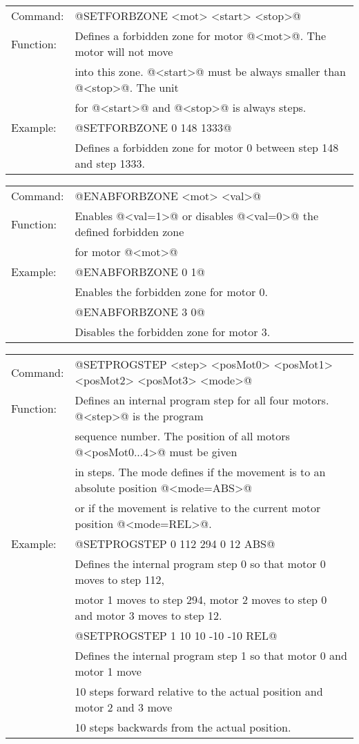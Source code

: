 \vspace{\vdistace}

\begin{tabular}{ll}
Command: & @SETFORBZONE <mot> <start> <stop>@\\
Function: & Defines a forbidden zone for motor @<mot>@. The motor will not move\\
		& into this zone. @<start>@ must be always smaller than @<stop>@. The unit\\
		& for @<start>@ and @<stop>@ is always steps.\\
Example: & @SETFORBZONE 0 148 1333@\\
		& Defines a forbidden zone for motor 0 between step 148 and step 1333.
\end{tabular}

\vspace{\vdistace}

\begin{tabular}{ll}
Command: & @ENABFORBZONE <mot> <val>@\\
Function: & Enables @<val=1>@ or disables @<val=0>@ the defined forbidden zone\\
		& for motor @<mot>@\\
Example: & @ENABFORBZONE 0 1@\\
		& Enables the forbidden zone for motor 0.\\
		& @ENABFORBZONE 3 0@\\
		& Disables the forbidden zone for motor 3.
\end{tabular}

\vspace{\vdistace}

\begin{tabular}{ll}
Command: & @SETPROGSTEP <step> <posMot0> <posMot1> <posMot2> <posMot3> <mode>@\\
Function: & Defines an internal program step for all four motors. @<step>@ is the program\\
		& sequence number. The position of all motors @<posMot0...4>@ must be given\\
		& in steps. The mode defines if the movement is to an absolute position @<mode=ABS>@\\
		& or if the movement is relative to the current motor position @<mode=REL>@.\\
Example: & @SETPROGSTEP 0 112 294 0 12 ABS@\\
		& Defines the internal program step 0 so that motor 0 moves to step 112,\\
		& motor 1 moves to step 294, motor 2 moves to step 0 and motor 3 moves to step 12.\\
		& @SETPROGSTEP 1 10 10 -10 -10 REL@\\
		& Defines the internal program step 1 so that motor 0 and motor 1 move\\
		& 10 steps forward relative to the actual position and motor 2 and 3 move\\
		& 10 steps backwards from the actual position.
\end{tabular}

\lstDeleteShortInline@

\newpage

